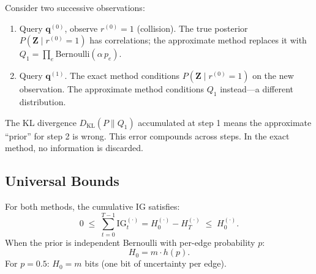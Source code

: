 \documentclass[11pt]{article}
\newcommand{\Ber}{\mathrm{Bernoulli}}
\begin{document}
Consider two successive observations:
\begin{enumerate}
  \item Query $\mathbf{q}^{(0)}$, observe $r^{(0)} = 1$ (collision).
        The true posterior $P(\mathbf{Z} \mid r^{(0)} = 1)$ has
        correlations; the approximate method replaces it with
        $Q_1 = \prod_e \Ber(\alpha\, p_e)$.
  \item Query $\mathbf{q}^{(1)}$.  The exact method conditions
        $P(\mathbf{Z} \mid r^{(0)} = 1)$ on the new observation.
        The approximate method conditions $Q_1$ instead---a
        different distribution.
\end{enumerate}
The KL divergence $D_{\mathrm{KL}}(P \| Q_1)$ accumulated at step 1
means the approximate ``prior'' for step 2 is wrong.  This error
compounds across steps.  In the exact method, no information is
discarded.

\subsection{Universal Bounds}

For both methods, the cumulative IG satisfies:
\begin{equation}
  0 \;\leq\; \sum_{t=0}^{T-1} \mathrm{IG}_t^{(\cdot)} = H_0^{(\cdot)} - H_T^{(\cdot)}
  \;\leq\; H_0^{(\cdot)}.
\end{equation}
When the prior is independent Bernoulli with per-edge probability $p$:
\[
  H_0 = m \cdot h(p).
\]
For $p = 0.5$: $H_0 = m$ bits (one bit of uncertainty per edge).
\end{document}
